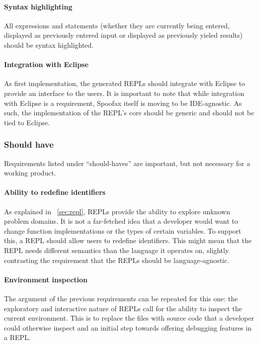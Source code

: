 \paragraph{Syntax highlighting} All expressions and statements (whether they are
currently being entered, displayed as previously entered input or displayed as
previously yieled results) should be syntax highlighted.

\paragraph{Integration with Eclipse} As first implementation, the generated
REPLs should integrate with Eclipse to provide an interface to the users. It is
important to note that while integration with Eclipse is a requirement, Spoofax
itself is moving to be IDE-agnostic. As such, the implementation of the REPL's
core should be generic and should not be tied to Eclipse.

\subsubsection{Should have}

Requirements listed under ``should-haves'' are important, but not necessary for
a working product.

\paragraph{Ability to redefine identifiers} As explained in ~\cref{sec:repl},
REPLs provide the ability to explore unknown problem domains. It is not a
far-fetched idea that a developer would want to change function implementations
or the types of certain variables. To support this, a REPL should allow users to
redefine identifiers. This might mean that the REPL needs different semantics
than the language it operates on, slightly contrasting the requirement that the
REPLs should be language-agnostic.

\paragraph{Environment inspection} The argument of the previous requirements can
be repeated for this one: the exploratory and interactive nature of REPLs call
for the ability to inspect the current environment. This is to replace the files
with source code that a developer could otherwise inspect and an initial step
towards offering debugging features in a REPL.

